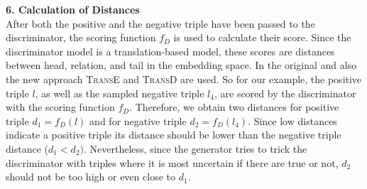 \textbf{6. Calculation of Distances}\\
%
After both the positive and the negative triple have been passed to the discriminator, the scoring function $f_D$ is used to calculate their score.
Since the discriminator model is a translation-based model, these scores are distances between head, relation, and tail in the embedding space.
In the original \kbgan and also the new \usgan approach \textsc{TransE} and \textsc{TransD} are used.
So for our example, the positive triple $l$, as well as the sampled negative triple $l_4$, are scored by the discriminator with the scoring function $f_D$.
Therefore, we obtain two distances for positive triple $d_1 = f_D(l)$ and for negative triple $d_2 = f_D(l_4)$.
Since low distances indicate a positive triple its distance should be lower than the negative triple distance ($d_1 < d_2)$.
Nevertheless, since the generator tries to trick the discriminator with triples where it is most uncertain if there are true or not, $d_2$ should not be too high or even close to $d_1$.
